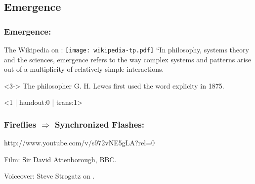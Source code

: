 \subsection{Emergence}

\begin{frame}
  \frametitle{Emergence:}

  \begin{block}{The Wikipedia on :
      \hfill
      \texttt{[image: wikipedia-tp.pdf]}
    }
    ``In philosophy, systems theory and the sciences, emergence refers to
    the way complex systems and patterns arise out of a multiplicity of
    relatively simple interactions. 
  \end{block}

\begin{block}<3->{}
    The philosopher G. H. Lewes first
    used the word explicity in 1875.
\end{block}


\end{frame}

\begin{frame}<1 | handout:0 | trans:1>
  \frametitle{Fireflies $\Rightarrow$ Synchronized Flashes:}

  {http://www.youtube.com/v/s972vNE5gLA?rel=0}

  \small

  Film: Sir David Attenborough, BBC.

  Voiceover: Steve Strogatz on 
  .

\end{frame}

